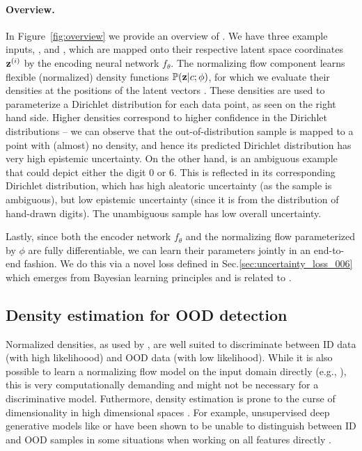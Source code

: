 \paragraph{Overview.} In Figure~\ref{fig:overview} we provide an overview of \PostNet. We have three example inputs,  , and , which are mapped onto their respective latent space coordinates $\latent\dataix$ by the encoding neural network $f_\theta$. The normalizing flow component learns flexible (normalized) density functions $\mathbb{P}(\bold{z}|c;\phi)$, for which we evaluate their densities at the positions of the latent vectors \smash{$\latent\dataix$}. These densities are used to parameterize a Dirichlet distribution for each data point, as seen on the right hand side. Higher densities correspond to higher confidence in the Dirichlet distributions -- we can observe that the out-of-distribution sample  is mapped to a point with (almost) no density, and hence its predicted Dirichlet distribution has very high epistemic uncertainty. On the other hand,  is an ambiguous example that could depict either the digit 0 or 6. This is reflected in its corresponding Dirichlet distribution, which has high aleatoric uncertainty (as the sample is ambiguous), but low epistemic uncertainty (since it is from the distribution of hand-drawn digits). The unambiguous sample  has low overall uncertainty.

Lastly, since both the encoder network $f_\theta$ and the normalizing flow parameterized by $\phi$ are fully differentiable, we can learn their parameters jointly in an end-to-end fashion. We do this via a novel loss  defined in Sec.\ref{sec:uncertainty_loss_006} which emerges from Bayesian learning principles \cite{PAC-bayesian_estimator} and is related to \UCEacro \cite{uceloss}.

\subsection{Density estimation for OOD detection}

Normalized densities, as used by \PostNetacro, are well suited to discriminate between ID data (with high likelihoood) and OOD data (with low likelihood). While it is also possible to learn a normalizing flow model on the input domain directly (e.g., \cite{maf, why-nf-fail-ood, grathwohl2018scalable}), this is very computationally demanding and might not be necessary for a discriminative model. Futhermore, density estimation is prone to the curse of dimensionality in high dimensional spaces \cite{typicality_OOD_generative, anomaly-detection}. For example, unsupervised deep generative models like \cite{glow} or \cite{pixel_cnn} have been shown to be unable to distinguish between ID and OOD samples in some situations when working on all features directly \cite{deep-generative, energy_based_classifier}. 

